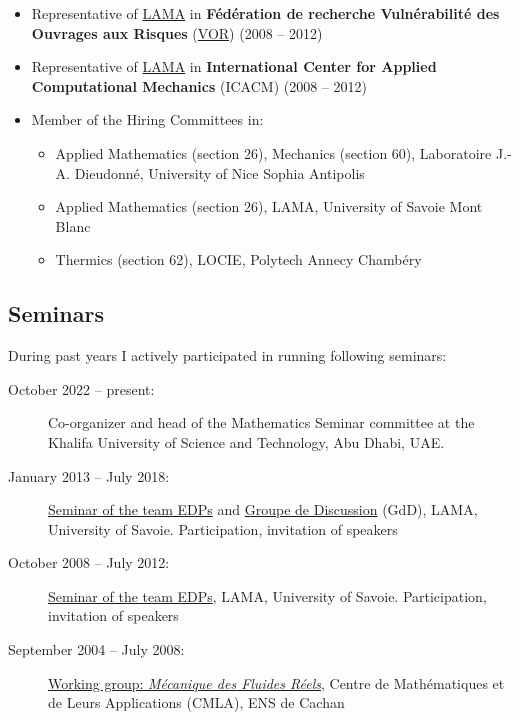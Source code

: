 \documentclass[final, a4paper, oneside, 12pt]{article}
\numberwithin{equation}{section}
\begin{document}
\begin{itemize}
  \item Representative of \href{http://www.lama.univ-savoie.fr/}{LAMA} in \textbf{F\'ed\'eration de recherche Vuln\'erabilit\'e des Ouvrages aux Risques} (\href{http://vor.grenoble-inp.fr}{VOR}) (2008 -- 2012)
  
  \item Representative of \href{http://www.lama.univ-savoie.fr/}{LAMA} in \textbf{International Center for Applied Computational Mechanics} (ICACM) (2008 -- 2012)
  
  \item Member of the Hiring Committees in:
  \begin{itemize}
    \item Applied Mathematics (section 26), Mechanics (section 60), Laboratoire J.-A. Dieudonn\'e, University of Nice Sophia Antipolis
    \item Applied Mathematics (section 26), LAMA, University of Savoie Mont Blanc
    \item Thermics (section 62), LOCIE, Polytech Annecy Chamb\'ery
  \end{itemize}

\end{itemize}

\subsection{Seminars}

During past years I actively participated in running following seminars:

\begin{description}
  
  \item[October 2022 -- present:] Co-organizer and head of the Mathematics Seminar committee at the Khalifa University of Science and Technology, Abu Dhabi, UAE.

  \item[January 2013 -- July 2018:] \href{http://www.lama.univ-savoie.fr/index.php?use=seminaires&equipe=edp&lang=en}{Seminar of the team EDPs} and \href{https://www.lama.univ-savoie.fr/~garnier/fr.GdD_EDP2.html}{Groupe de Discussion} (GdD), LAMA, University of Savoie. Participation, invitation of speakers
  
  \item[October 2008 -- July 2012:] \href{http://www.lama.univ-savoie.fr/index.php?use=seminaires&equipe=edp&lang=en}{Seminar of the team EDPs}, LAMA, University of Savoie. Participation, invitation of speakers
  
  \item[September 2004 -- July 2008:] \href{http://www.cmla.ens-cachan.fr/la-recherche/groupes-de-travail/gdtmf.html}{Working group: \textit{M\'ecanique des Fluides R\'eels}}, Centre de Math\'ematiques et de Leurs Applications (CMLA), ENS de Cachan

\end{description}
\end{document}
